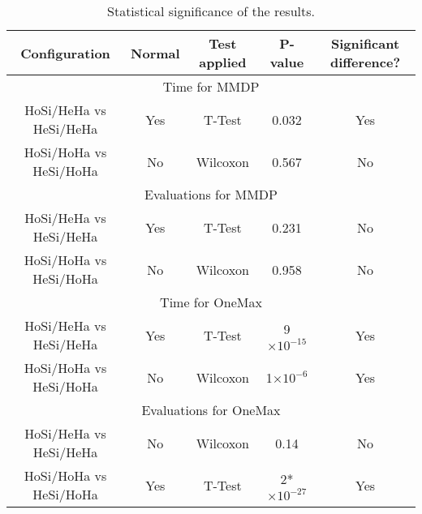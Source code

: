 \documentclass{sig-alternate}
\providecommand{\e}[1]{\ensuremath{\times 10^{#1}}}
\begin{document}
\begin{table*}
\centering
\caption{Statistical significance of the results.}
\begin{tabular}{|c|c|c|c|c|} \hline

Configuration			&Normal	&Test applied			&P-value & Significant difference?\\ \hline
\multicolumn{5}{|c|}{Time for MMDP} \\ \hline
HoSi/HeHa vs HeSi/HeHa	&Yes	&T-Test			&0.032 	 & Yes \\ \hline
HoSi/HoHa vs HeSi/HoHa	&No		&Wilcoxon		&0.567 	 & No \\ \hline
\multicolumn{5}{|c|}{Evaluations for MMDP}	\\ \hline
HoSi/HeHa vs HeSi/HeHa	&Yes	&T-Test			&0.231  & No \\ \hline
HoSi/HoHa vs HeSi/HoHa	&No		&Wilcoxon		&0.958  & No \\ \hline
\multicolumn{5}{|c|}{Time for OneMax} \\ \hline
HoSi/HeHa vs HeSi/HeHa	& Yes	& T-Test		&  9\e{-15} & Yes \\ \hline
HoSi/HoHa vs HeSi/HoHa	& No	& Wilcoxon		& 	1\e{-6}		& Yes \\ \hline
\multicolumn{5}{|c|}{Evaluations for OneMax}	\\ \hline
HoSi/HeHa vs HeSi/HeHa	& No	& Wilcoxon 		&	0.14 		& No\\ \hline
HoSi/HoHa vs HeSi/HoHa	& Yes	& T-Test		&	2*\e{-27}	& Yes \\ \hline
\end{tabular}
\label{tab:significance}
\end{table*}



%
\end{document}
